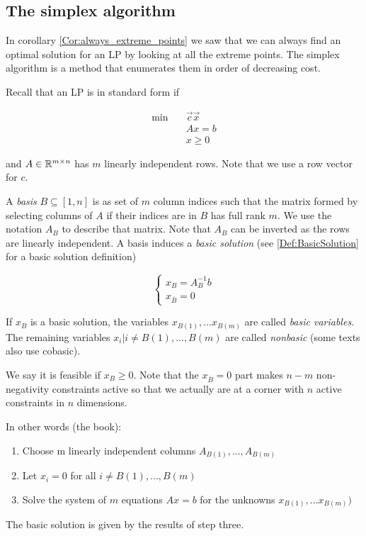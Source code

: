 \subsection{The simplex algorithm}

In corollary \ref{Cor:always_extreme_points} we saw that we can always find an optimal solution for an LP by looking at all the extreme points. The simplex algorithm is a method that enumerates them in order of decreasing cost. 

Recall that an LP is in standard form if

\begin{align*}
\min \quad & \vec c\vec x\\
&Ax = b\\
&x\geq 0
\end{align*}

and $A\in \mathbb{R}^{m\times n}$ has $m$ linearly independent rows. Note that we use a row vector for $c$.

A \emph{basis} $B\subseteq [1,n]$ is as set of $m$ column indices such that the matrix formed by selecting columns of $A$ if their indices are in $B$ has full rank $m$. We use the notation $A_B$ to describe that matrix. Note that $A_B$ can be inverted as the rows are linearly independent. A basis induces a \emph{basic solution} (see \ref{Def:BasicSolution} for a basic solution definition)

\[\begin{cases} x_B = A^{-1}_Bb\\ x_{\bar B} = 0\end{cases}\]

If $x_B$ is a basic solution, the variables $x_{B(1)},...x_{B(m)}$ are called \emph{basic variables}. The remaining variables $x_i|i \neq B(1),...,B(m)$ are called \emph{nonbasic} (some texts also use cobasic). 

We say it is feasible if $x_B\geq 0$. Note that the $x_{\bar B}=0$ part makes $n-m$ non-negativity constraints active so that we actually are at a corner with $n$ active constraints in $n$ dimensions.

In other words (the book):
\begin{enumerate} 
 \item Choose m linearly independent columns $A_{B(1)},...,A_{B(m)}$
 \item Let $x_i=0$ for all $i \neq B(1),...,B(m)$
 \item Solve the system of $m$ equations $Ax=b$ for the unknowns $x_{B(1)},...x_{B(m)})$
\end{enumerate}
The basic solution is given by the results of step three.

